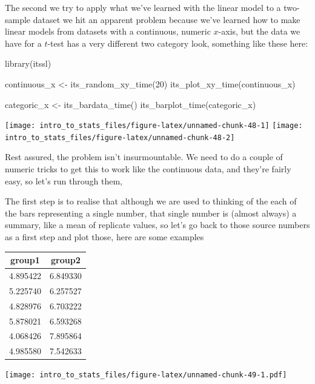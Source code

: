 \documentclass[
]{book}
\newenvironment{Shaded}{\begin{snugshade}}{\end{snugshade}}
\newcommand{\DecValTok}[1]{\textcolor[rgb]{0.00,0.00,0.81}{#1}}
\newcommand{\FunctionTok}[1]{\textcolor[rgb]{0.00,0.00,0.00}{#1}}
\newcommand{\NormalTok}[1]{#1}
\newcommand{\OtherTok}[1]{\textcolor[rgb]{0.56,0.35,0.01}{#1}}
\begin{document}
The second we try to apply what we've learned with the linear model to a two-sample dataset we hit an apparent problem because we've learned how to make linear models from datasets with a continuous, numeric \(x\)-axis, but the data we have for a \(t\)-test has a very different two category look, something like these here:

\begin{Shaded}
\begin{Highlighting}[]
\FunctionTok{library}\NormalTok{(itssl)}

\NormalTok{continuous\_x }\OtherTok{\textless{}{-}} \FunctionTok{its\_random\_xy\_time}\NormalTok{(}\DecValTok{20}\NormalTok{)}
\FunctionTok{its\_plot\_xy\_time}\NormalTok{(continuous\_x)}

\NormalTok{categoric\_x }\OtherTok{\textless{}{-}} \FunctionTok{its\_bardata\_time}\NormalTok{()}
\FunctionTok{its\_barplot\_time}\NormalTok{(categoric\_x)}
\end{Highlighting}
\end{Shaded}

\texttt{[image: intro\_to\_stats\_files/figure-latex/unnamed-chunk-48-1]} \texttt{[image: intro\_to\_stats\_files/figure-latex/unnamed-chunk-48-2]}

Rest assured, the problem isn't insurmountable. We need to do a couple of numeric tricks to get this to work like the continuous data, and they're fairly easy, so let's run through them,

The first step is to realise that although we are used to thinking of the each of the bars representing a single number, that single number is (almost always) a summary, like a mean of replicate values, so let's go back to those source numbers as a first step and plot those, here are some examples

\begin{tabular}{c|c}
\hline
group1 & group2\\
\hline
4.895422 & 6.849330\\
\hline
5.225740 & 6.257527\\
\hline
4.828976 & 6.703222\\
\hline
5.878021 & 6.593268\\
\hline
4.068426 & 7.895864\\
\hline
4.985580 & 7.542633\\
\hline
\end{tabular}

\texttt{[image: intro\_to\_stats\_files/figure-latex/unnamed-chunk-49-1.pdf]}
\end{document}
